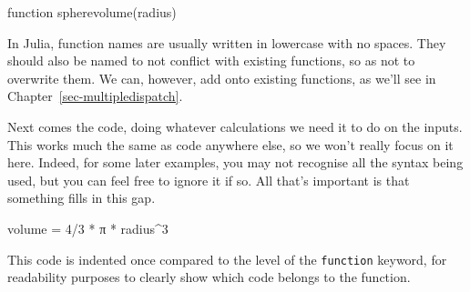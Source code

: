 \documentclass[
  letterpaper,
  DIV=11,
  numbers=noendperiod]{scrreprt}
\newenvironment{Shaded}{\begin{snugshade}}{\end{snugshade}}
\newcommand{\ConstantTok}[1]{\textcolor[rgb]{0.56,0.35,0.01}{#1}}
\newcommand{\FloatTok}[1]{\textcolor[rgb]{0.68,0.00,0.00}{#1}}
\newcommand{\FunctionTok}[1]{\textcolor[rgb]{0.28,0.35,0.67}{#1}}
\newcommand{\KeywordTok}[1]{\textcolor[rgb]{0.00,0.23,0.31}{#1}}
\newcommand{\NormalTok}[1]{\textcolor[rgb]{0.00,0.23,0.31}{#1}}
\newcommand{\OperatorTok}[1]{\textcolor[rgb]{0.37,0.37,0.37}{#1}}
\begin{document}
\begin{Shaded}
\begin{Highlighting}[]
\KeywordTok{function} \FunctionTok{spherevolume}\NormalTok{(radius)}
\end{Highlighting}
\end{Shaded}

\begin{tcolorbox}[enhanced jigsaw, toprule=.15mm, opacitybacktitle=0.6, leftrule=.75mm, breakable, coltitle=black, bottomrule=.15mm, colbacktitle=quarto-callout-tip-color!10!white, bottomtitle=1mm, rightrule=.15mm, title=\textcolor{quarto-callout-tip-color}{\faLightbulb}\hspace{0.5em}{Convention}, colframe=quarto-callout-tip-color-frame, left=2mm, colback=white, opacityback=0, arc=.35mm, toptitle=1mm, titlerule=0mm]

In Julia, function names are usually written in lowercase with no
spaces. They should also be named to not conflict with existing
functions, so as not to overwrite them. We can, however, add onto
existing functions, as we'll see in Chapter~\ref{sec-multipledispatch}.

\end{tcolorbox}

Next comes the code, doing whatever calculations we need it to do on the
inputs. This works much the same as code anywhere else, so we won't
really focus on it here. Indeed, for some later examples, you may not
recognise all the syntax being used, but you can feel free to ignore it
if so. All that's important is that something fills in this gap.

\begin{Shaded}
\begin{Highlighting}[]
\NormalTok{    volume }\OperatorTok{=} \FloatTok{4}\OperatorTok{/}\FloatTok{3} \OperatorTok{*} \ConstantTok{π} \OperatorTok{*}\NormalTok{ radius}\OperatorTok{\^{}}\FloatTok{3}
\end{Highlighting}
\end{Shaded}

\begin{tcolorbox}[enhanced jigsaw, toprule=.15mm, opacitybacktitle=0.6, leftrule=.75mm, breakable, coltitle=black, bottomrule=.15mm, colbacktitle=quarto-callout-tip-color!10!white, bottomtitle=1mm, rightrule=.15mm, title=\textcolor{quarto-callout-tip-color}{\faLightbulb}\hspace{0.5em}{Convention}, colframe=quarto-callout-tip-color-frame, left=2mm, colback=white, opacityback=0, arc=.35mm, toptitle=1mm, titlerule=0mm]

This code is indented once compared to the level of the
\texttt{function} keyword, for readability purposes to clearly show
which code belongs to the function.

\end{tcolorbox}
\end{document}
